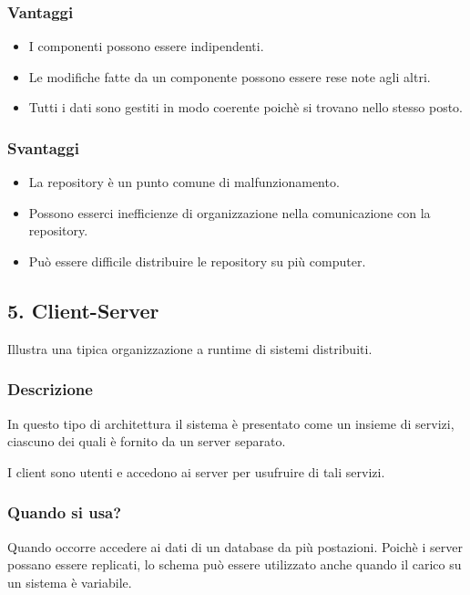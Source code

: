 \documentclass{report}
\begin{document}
\begin{multicols}{2}

    \subsubsection*{Vantaggi}
    \begin{itemize}
        \item I componenti possono essere indipendenti.
        \item Le modifiche fatte da un componente possono essere rese note agli altri.
        \item Tutti i dati sono gestiti in modo coerente poichè si trovano nello stesso posto.
    \end{itemize}
    
    \columnbreak
    
    \subsubsection*{Svantaggi}
    \begin{itemize}
        \item La repository è un punto comune di malfunzionamento.
        \item Possono esserci inefficienze di organizzazione nella comunicazione con la repository.
        \item Può essere difficile distribuire le repository su più computer.
    \end{itemize}
    
\end{multicols}

\subsection*{5. Client-Server}
Illustra una tipica organizzazione a runtime di sistemi distribuiti.

\subsubsection*{Descrizione}
In questo tipo di architettura il sistema è presentato come un insieme di servizi, ciascuno dei quali è fornito da un server separato.

\noindent
I client sono utenti e accedono ai server per usufruire di tali servizi.

\subsubsection*{Quando si usa?}
Quando occorre accedere ai dati di un database da più postazioni. Poichè i server possano essere replicati, lo schema può essere utilizzato anche quando il carico su un sistema è variabile.
\end{document}
